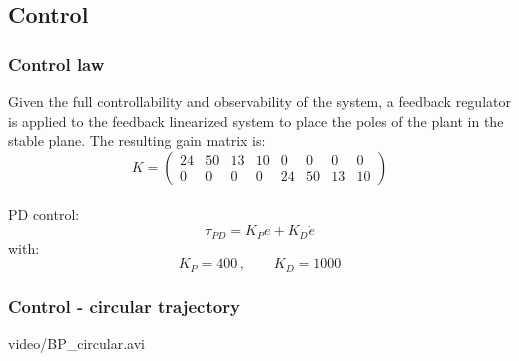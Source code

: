 \subsection{Control}
%
\begin{frame}
\frametitle{Control law}
Given the full controllability and observability of the system, a feedback regulator is applied to the feedback linearized system to place the poles of the plant in the stable plane. The resulting gain matrix is:
\begin{equation*}
	K =%
	\begin{pmatrix}
		24 &50 &13 &10 &0 &0 &0 &0 \\
		0 &0 &0 &0 &24 &50 &13 &10
	\end{pmatrix}
\end{equation*}\\[8pt]
PD control:
\begin{equation*}
\tau_{PD}= K_Pe + K_D\dot{e}
\end{equation*}
with:
\[ K_P = 400\,, \qquad K_D = 1000\]
\end{frame}
%
\begin{frame}
\frametitle{Control - circular trajectory}
	\begin{center}
	{video/BP_circular.avi}
	\end{center}
\end{frame}
%
